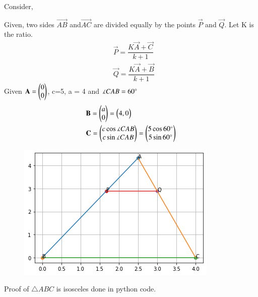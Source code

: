\documentclass[journal,12pt,twocolumn]{IEEEtran}
\renewcommand\thesection{\arabic{section}}
\begin{document}
\begin{enumerate}[label=\thesection.\arabic*.,ref=\thesection.\theenumi]
Consider,
\begin{table}[htb]
 \centering
 \caption{}
 \label{tab:dup-2}
 \end{table}
 Given, two sides $\vec{AB}$ and$\vec{AC}$ are divided equally by the points $\vec{P}$ and $\vec{Q}$. Let K is the ratio.\\
 \begin{align}
 &\vec{P} = \dfrac{K\vec{A}+\vec{C}}{k+1}\\
 &\vec{Q} = \dfrac{K\vec{A}+\vec{B}}{k+1}
 \end{align}
 Given $\mathbf{A} = \begin{pmatrix}0\\0\end{pmatrix}$, c=5, a = 4 and $\measuredangle{CAB} = 60\degree$ 
 \begin{align}
 &\mathbf{B} = \begin{pmatrix}a\\0\end{pmatrix} = \begin{pmatrix}4,0\end{pmatrix}\\
 &\mathbf{C} = \begin{pmatrix}c\cos \measuredangle{CAB}\\ c\sin \measuredangle{CAB}\end{pmatrix} = \begin{pmatrix}5 \cos 60\degree\\5\sin 60\degree\end{pmatrix}
 \end{align}
\begin{figure}[H]
	\centering
    \includegraphics[width=\columnwidth]{l_9.png}
    \caption{}
    \label{l_9}
\end{figure}
Proof of $\triangle{ABC}$ is isosceles done in python code.\\

 \end{enumerate}
\end{document}
